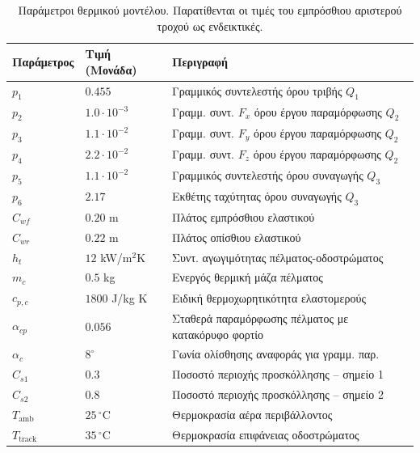 \begin{table}[htbp]
    \centering
    \small
    \renewcommand{\arraystretch}{1.2}
    \begin{tabular}{@{}l l l@{}}
        \toprule
        \textbf{Παράμετρος} & \textbf{Τιμή (Μονάδα)} & \textbf{Περιγραφή} \\
        \midrule
        $p_1$                & $0.455$                 & Γραμμικός συντελεστής όρου τριβής $Q_1$ \\
        $p_2$                & $1.0 \cdot 10^{-3}$     & Γραμμ. συντ. $F_x$ όρου έργου παραμόρφωσης $Q_2$ \\
        $p_3$                & $1.1 \cdot 10^{-2}$     & Γραμμ. συντ. $F_y$ όρου έργου παραμόρφωσης $Q_2$ \\
        $p_4$                & $2.2 \cdot 10^{-2}$     & Γραμμ. συντ. $F_z$ όρου έργου παραμόρφωσης $Q_2$ \\
        $p_5$                & $1.1 \cdot 10^{-2}$     & Γραμμικός συντελεστής όρου συναγωγής $Q_3$ \\
        $p_6$                & $2.17$                  & Εκθέτης ταχύτητας όρου συναγωγής $Q_3$ \\
        $C_{wf}$               & $0.20$ m                & Πλάτος εμπρόσθιου ελαστικού \\
        $C_{wr}$               & $0.22$ m                & Πλάτος οπίσθιου ελαστικού \\
        $h_t$                & $12$ kW/m$^2$K          & Συντ. αγωγιμότητας πέλματος-οδοστρώματος \\
        $m_c$                & $0.5$ kg                & Ενεργός θερμική μάζα πέλματος \\
        $c_{p,c}$            & $1800$ J/kg K           & Ειδική θερμοχωρητικότητα ελαστομερούς \\
        $\alpha_{cp}$        & $0.056$                & Σταθερά παραμόρφωσης πέλματος με κατακόρυφο φορτίο \\
        $\alpha_c$           & $8^\circ$           & Γωνία ολίσθησης αναφοράς για γραμμ. παρ. \\
        $C_{s1}$             & $0.3$                  & Ποσοστό περιοχής προσκόλλησης -- σημείο 1\\
        $C_{s2}$             & $0.8$                  & Ποσοστό περιοχής προσκόλλησης -- σημείο 2\\
        $T_{\mathrm{amb}}$   & $25\,^\circ\mathrm{C}$  & Θερμοκρασία αέρα περιβάλλοντος \\
        $T_{\mathrm{track}}$ & $35\,^\circ\mathrm{C}$  & Θερμοκρασία επιφάνειας οδοστρώματος \\
        \bottomrule
    \end{tabular}
    \caption{Παράμετροι θερμικού μοντέλου. Παρατίθενται οι τιμές του εμπρόσθιου
    αριστερού τροχού ως ενδεικτικές.}
    \label{tab:params_thermal}
\end{table}